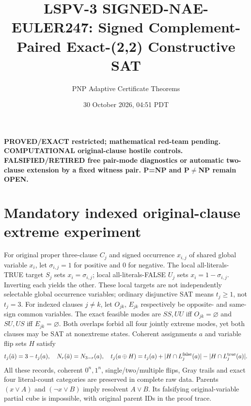 \documentclass[10pt]{article}
\title{LSPV-3 SIGNED-NAE-EULER247: Signed Complement-Paired Exact-(2,2) Constructive SAT}
\author{PNP Adaptive Certificate Theorems}
\date{30 October 2026, 04:51 PDT}
\begin{document}
\maketitle
\noindent\textbf{PROVED/EXACT restricted; mathematical red-team pending. COMPUTATIONAL original-clause hostile controls. FALSIFIED/RETIRED free pair-mode diagnostics or automatic two-clause extension by a fixed witness pair. P=NP and P$\ne$NP remain OPEN.}

\section{Mandatory indexed original-clause extreme experiment}
For original proper three-clause $C_j$ and signed occurrence $x_{i,j}$ of shared global variable $x_i$, let $\sigma_{i,j}=1$ for positive and 0 for negative. The local all-literals-TRUE target $S_j$ sets $x_i=\sigma_{i,j}$; local all-literals-FALSE $U_j$ sets $x_i=1-\sigma_{i,j}$. Inverting each yields the other. These local targets are not independently selectable global occurrence variables; ordinary disjunctive SAT means $t_j\ge1$, not $t_j=3$.
For indexed clauses $j\ne k$, let $O_{jk}$, $E_{jk}$ respectively be opposite- and same-sign common variables. The exact feasible modes are $SS,UU$ iff $O_{jk}=\varnothing$ and $SU,US$ iff $E_{jk}=\varnothing$. Both overlaps forbid all four jointly extreme modes, yet both clauses may be SAT at nonextreme states. Coherent assignments $a$ and variable flip sets $H$ satisfy
\[
t_j(\bar a)=3-t_j(a),\quad N_r(\bar a)=N_{3-r}(a),\quad
t_j(a\oplus H)=t_j(a)+|H\cap L_j^{\rm false}(a)|-|H\cap L_j^{\rm true}(a)|.
\]
All these records, coherent $0^n,1^n$, single/two/multiple flips, Gray trails and exact four literal-count categories are preserved in complete raw data. Parents $(x\vee A)$ and $(\neg x\vee B)$ imply resolvent $A\vee B$. Its falsifying original-variable partial cube is impossible, with original parent IDs in the proof trace.
\end{document}
